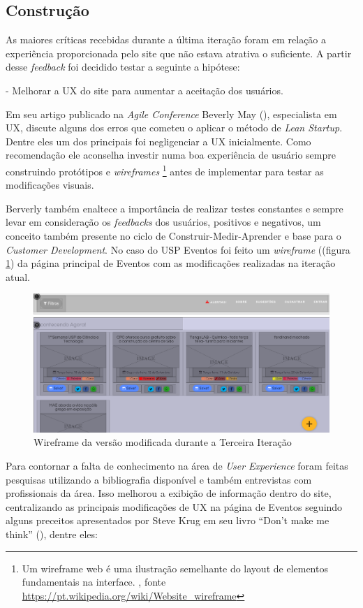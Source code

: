 \subsection{Construção}
	\par As maiores críticas recebidas durante a última iteração foram em relação a experiência proporcionada pelo site que não estava atrativa o suficiente. A partir desse \emph{feedback} foi decidido testar a seguinte a hipótese:
	\par - Melhorar a UX do site para aumentar a aceitação dos usuários.
	\par Em seu artigo publicado na \emph{Agile Conference} Beverly May (\cite{beverly:2012}), especialista em UX, discute alguns dos erros que cometeu o aplicar o método de \emph{Lean Startup}. Dentre eles um dos principais foi negligenciar a UX inicialmente. Como recomendação ele aconselha investir numa boa experiência de usuário sempre construindo protótipos e \emph{wireframes} \footnote{ Um wireframe web é uma ilustração semelhante do layout de elementos fundamentais na interface. , fonte \url{https://pt.wikipedia.org/wiki/Website_wireframe}} antes de implementar para testar as modificações visuais.
	 \par Berverly também enaltece a importância de realizar testes constantes e sempre levar em consideração os \emph{feedbacks} dos usuários, positivos e negativos, um conceito também presente no ciclo de Construir-Medir-Aprender e base para o \emph{Customer Development}. No caso do USP Eventos foi feito um \emph{wireframe} ((figura \ref{fig:wireframe}) da página principal de Eventos com as modificações realizadas na iteração atual.
\begin{figure}[htb]
\centering
\includegraphics[width=15cm]{figuras/wireframe}
\caption{\label{fig:wireframe} Wireframe da versão modificada durante a Terceira Iteração}
\end{figure}
\par Para contornar a falta de conhecimento na área de \emph{User Experience} foram feitas pesquisas utilizando a bibliografia disponível e também entrevistas com profissionais da área. Isso melhorou a exibição de informação dentro do site, centralizando as principais modificações de UX na página de Eventos seguindo alguns preceitos apresentados por Steve Krug em seu livro ``Don't make me think'' (\cite{krug:00}), dentre eles:
